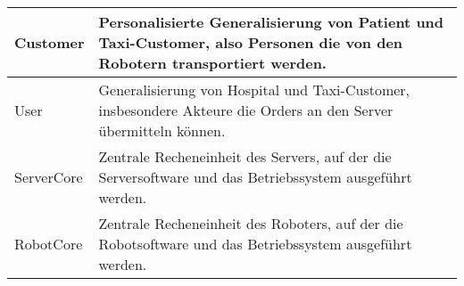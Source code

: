 \begin{tabularx}{\textwidth}{|l|X|}
		Customer & Personalisierte Generalisierung von Patient und Taxi-Customer, also Personen die von den Robotern transportiert werden.\\ \hline
		User & Generalisierung von Hospital und Taxi-Customer, insbesondere Akteure die Orders an den Server übermitteln können.\\ \hline
		ServerCore & Zentrale Recheneinheit des Servers, auf der die Serversoftware und das Betriebssystem ausgeführt werden.\\ \hline
		RobotCore & Zentrale Recheneinheit des Roboters, auf der die Robotsoftware und das Betriebssystem ausgeführt werden.\\ \hline
	\end{tabularx}
